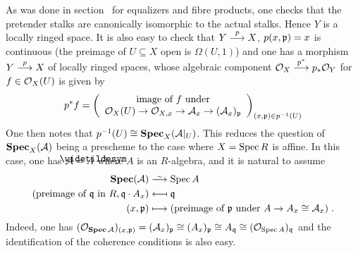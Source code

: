 \documentclass[a4paper,parskip=half,numbers=enddot, DIV=12]{scrreprt}
\begin{document}
As was done in section~ for equalizers and fibre products, one checks that the pretender stalks are canonically isomorphic to the actual stalks. Hence $Y$ is a locally ringed space. It is also easy to check that $Y\morphism[p] X$, $p(x,\mathfrak{p})=x$ is continuous (the preimage of $U\subseteq X$ open is $\Omega(U, 1)$) and one has a morphism $Y\morphism[p] X$ of locally ringed spaces, whose algebraic component $\Oo_X\morphism[p^*]p_*\Oo_Y$ for $f\in\mathcal{O}_X(U)$ is given by 
\begin{align*}
	p^* f=\left(
	\begin{array}{c}
		\text{image of }f\text{ under}\\
		\Oo_X(U) \morphism \Oo_{X,x} \morphism \Aa_x \morphism (\Aa_x)_\pp 
	\end{array}\right)_{(x,\pp)\in p^{-1}(U)}
\end{align*}
One then notes that $p^{-1} (U)\cong \operatorname{\mathbf{Spec}}_X(\mathcal{A}|_U)$. This reduces the question of $\operatorname{\mathbf{Spec}}_X(\mathcal{A})$ being a prescheme to the case where $X=\operatorname{Spec} R$ is affine. In this case, one has $\Aa= \snake A$ where $A$ is an $R$-algebra, and it is natural to assume 
\begin{align*}
    \SPEC(\Aa)&\isomorphism \Spec A\\
    (\text{preimage of }\qq\text{ in }R, \qq \cdot A_x) &\longmapsfrom \qq\\
    (x,\pp)  &\longmapsto (\text{preimage of }\pp\text{ under } A\to A_x \cong \Aa_x)\;.
\end{align*}
Indeed, one has $(\mathcal{O}_{\operatorname{\mathbf{Spec}} \mathcal{A}})_{(x,\mathfrak{p})} = (\mathcal{A}_x)_{\mathfrak{p}} \cong (A_x)_{\mathfrak{p}} \cong A_{\mathfrak{q}} \cong (\mathcal{O}_{\operatorname{Spec} A})_{\mathfrak{q}}$ and the identification of the coherence conditions is also easy.
\end{document}
